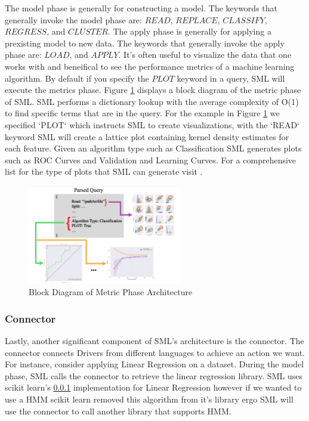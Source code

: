 \documentclass[jair,twoside,11pt,theapa]{article}
\begin{document}
The model phase is generally for constructing a model. The keywords that generally invoke the model phase are: \(READ\), \(REPLACE\), \(CLASSIFY\), \(REGRESS\), and \(CLUSTER\). The apply phase is generally for applying a prexisting model  to new data. The keywords that generally invoke the apply phase are: \(LOAD\), and \(APPLY\). It's often useful to visualize the data that one works with and beneifical to see the performance metrics of a machine learning algorithm. By default if you specify the \(PLOT\) keyword in a query, SML will execute the metrics phase. Figure \ref{fig:metric-phase} displays a block diagram of the metric phase of SML. SML performs a dictionary lookup with the average complexity of O(1) to find specific terms that are in the query. For the example in Figure \ref{fig:metric-phase} we specified `PLOT` which instructs SML to create visualizations, with the `READ` keyword SML will create a lattice plot containing kernel density estimates for each feature. Given an algorithm type such as Classification SML generates plots such as ROC Curves and Validation and Learning Curves. For a comprehensive list for the type of plots that SML can generate visit  \cite{}.

\begin{figure}
\includegraphics[width=0.6\textwidth]{figs/metric-phase.png}
\centering
\caption{Block Diagram of Metric Phase Architecture}
\label{fig:metric-phase}
\end{figure}

\subsubsection{Connector}
Lastly, another significant component of SML's architecture is the connector. The connector connects Drivers from different languages to achieve an action we want. For instance, consider applying  Linear Regression on a dataset. During the model phase, SML calls the connector to retrieve the linear regression library. SML uses scikit learn's \ref{} implementation for Linear Regression however if we wanted to use a HMM scikit learn removed this algorithm from it's library ergo SML will use the connector to call another library that supports HMM.
\end{document}
